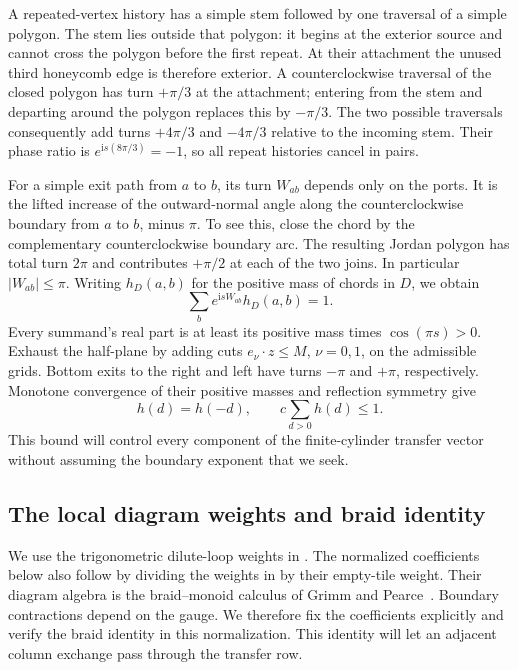 A repeated-vertex history has a simple stem followed by one traversal
of a simple polygon.  The stem lies outside that polygon: it begins at
the exterior source and cannot cross the polygon before the first
repeat.  At their attachment the unused third honeycomb edge is therefore
exterior.  A counterclockwise traversal of the closed polygon has turn
$+\pi/3$ at the attachment; entering from the stem and departing around
the polygon replaces this by $-\pi/3$.  The two possible traversals
consequently add turns $+4\pi/3$ and $-4\pi/3$ relative to the incoming
stem.  Their phase ratio is $e^{\mathrm i s(8\pi/3)}=-1$, so all
repeat histories cancel in pairs.

For a simple exit path from $a$ to $b$, its turn $W_{ab}$ depends only on
the ports.  It is the lifted increase of the outward-normal angle along
the counterclockwise boundary from $a$ to $b$, minus $\pi$.  To see this,
close the chord by the complementary counterclockwise boundary arc.
The resulting Jordan polygon has total turn $2\pi$ and contributes
$+\pi/2$ at each of the two joins.  In particular $|W_{ab}|\le\pi$.
Writing $h_D(a,b)$ for the positive mass of chords in $D$, we obtain
\begin{equation}
 \sum_b e^{\mathrm i sW_{ab}}h_D(a,b)=1.
 \label{c2:eq-1}
\end{equation}
Every summand's real part is at least its positive mass times
$\cos(\pi s)>0$.  Exhaust the half-plane by adding cuts
$e_\nu\cdot z\le M$, $\nu=0,1$, on the admissible grids.  Bottom
exits to the right and left have turns $-\pi$ and $+\pi$, respectively.
Monotone convergence of their positive masses and reflection symmetry give
\begin{equation}
 h(d)=h(-d),\qquad c\sum_{d>0}h(d)\le1.
 \label{c2:eq-2}
\end{equation}
This bound will control every component of the finite-cylinder transfer
vector without assuming the boundary exponent that we seek.

\subsection{The local diagram weights and braid identity}

We use the trigonometric dilute-loop weights in
\cite{GlazmanManolescu2017}.  The normalized coefficients below also
follow by dividing the weights in \cite[Eq.~(1.2)]{ZhouBatchelor1997}
by their empty-tile weight.  Their diagram algebra is the braid--monoid
calculus of Grimm and Pearce~\cite[Eq.~(4.20)]{GrimmPearce1993}.
Boundary contractions depend on the gauge.  We therefore fix the
coefficients explicitly and verify the braid identity in this
normalization.  This identity will let an adjacent column exchange pass
through the transfer row.

